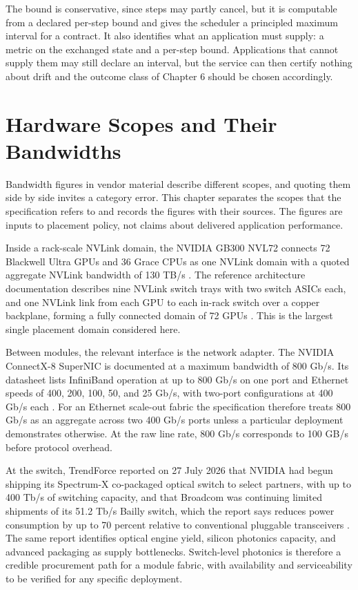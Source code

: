 \documentclass[11pt,openany]{book}
\theoremstyle{remark}
\begin{document}
The bound is conservative, since steps may partly cancel, but it is computable from a declared per-step bound and gives the scheduler a principled maximum interval for a contract. It also identifies what an application must supply: a metric on the exchanged state and a per-step bound. Applications that cannot supply them may still declare an interval, but the service can then certify nothing about drift and the outcome class of Chapter 6 should be chosen accordingly.

\chapter{Hardware Scopes and Their Bandwidths}

Bandwidth figures in vendor material describe different scopes, and quoting them side by side invites a category error. This chapter separates the scopes that the specification refers to and records the figures with their sources. The figures are inputs to placement policy, not claims about delivered application performance.

Inside a rack-scale NVLink domain, the NVIDIA GB300 NVL72 connects 72 Blackwell Ultra GPUs and 36 Grace CPUs as one NVLink domain with a quoted aggregate NVLink bandwidth of 130 TB/s \cite{nvidia-gb300}. The reference architecture documentation describes nine NVLink switch trays with two switch ASICs each, and one NVLink link from each GPU to each in-rack switch over a copper backplane, forming a fully connected domain of 72 GPUs \cite{nvidia-ra}. This is the largest single placement domain considered here.

Between modules, the relevant interface is the network adapter. The NVIDIA ConnectX-8 SuperNIC is documented at a maximum bandwidth of 800 Gb/s. Its datasheet lists InfiniBand operation at up to 800 Gb/s on one port and Ethernet speeds of 400, 200, 100, 50, and 25 Gb/s, with two-port configurations at 400 Gb/s each \cite{nvidia-cx8}. For an Ethernet scale-out fabric the specification therefore treats 800 Gb/s as an aggregate across two 400 Gb/s ports unless a particular deployment demonstrates otherwise. At the raw line rate, 800 Gb/s corresponds to 100 GB/s before protocol overhead.

At the switch, TrendForce reported on 27 July 2026 that NVIDIA had begun shipping its Spectrum-X co-packaged optical switch to select partners, with up to 400 Tb/s of switching capacity, and that Broadcom was continuing limited shipments of its 51.2 Tb/s Bailly switch, which the report says reduces power consumption by up to 70 percent relative to conventional pluggable transceivers \cite{trendforce}. The same report identifies optical engine yield, silicon photonics capacity, and advanced packaging as supply bottlenecks. Switch-level photonics is therefore a credible procurement path for a module fabric, with availability and serviceability to be verified for any specific deployment.
\end{document}
